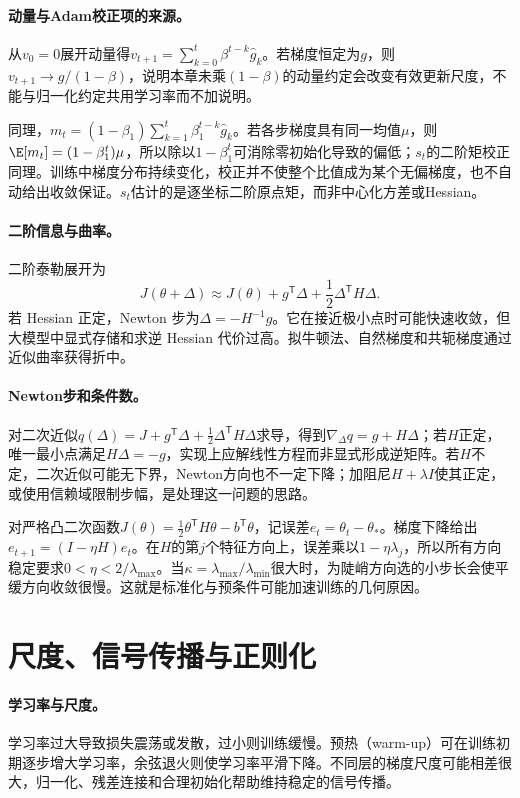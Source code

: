 \paragraph{动量与Adam校正项的来源。}
从$v_0=0$展开动量得$v_{t+1}=\sum_{k=0}^t\beta^{t-k}\hat g_k$。若梯度恒定为$g$，则$v_{t+1}\to g/(1-\beta)$，说明本章未乘$(1-\beta)$的动量约定会改变有效更新尺度，不能与归一化约定共用学习率而不加说明。

同理，$m_t=(1-\beta_1)\sum_{k=1}^t\beta_1^{t-k}\hat g_k$。若各步梯度具有同一均值$\mu$，则$\E[m_t]=(1-\beta_1^t)\mu$，所以除以$1-\beta_1^t$可消除零初始化导致的偏低；$s_t$的二阶矩校正同理。训练中梯度分布持续变化，校正并不使整个比值成为某个无偏梯度，也不自动给出收敛保证。$s_t$估计的是逐坐标二阶原点矩，而非中心化方差或Hessian。

\paragraph{二阶信息与曲率。}
二阶泰勒展开为
\begin{equation}
 J(\theta+\Delta)\approx J(\theta)+g^{\mathsf T}\Delta+\frac12\Delta^{\mathsf T}H\Delta.
\end{equation}
若 Hessian 正定，Newton 步为$\Delta=-H^{-1}g$。它在接近极小点时可能快速收敛，但大模型中显式存储和求逆 Hessian 代价过高。拟牛顿法、自然梯度和共轭梯度通过近似曲率获得折中。

\paragraph{Newton步和条件数。}
对二次近似$q(\Delta)=J+g^{\mathsf T}\Delta+\tfrac12\Delta^{\mathsf T}H\Delta$求导，得到$\nabla_\Delta q=g+H\Delta$；若$H$正定，唯一最小点满足$H\Delta=-g$，实现上应解线性方程而非显式形成逆矩阵。若$H$不定，二次近似可能无下界，Newton方向也不一定下降；加阻尼$H+\lambda I$使其正定，或使用信赖域限制步幅，是处理这一问题的思路。

对严格凸二次函数$J(\theta)=\tfrac12\theta^{\mathsf T}H\theta-b^{\mathsf T}\theta$，记误差$e_t=\theta_t-\theta_*$。梯度下降给出$e_{t+1}=(I-\eta H)e_t$。在$H$的第$j$个特征方向上，误差乘以$1-\eta\lambda_j$，所以所有方向稳定要求$0<\eta<2/\lambda_{\max}$。当$\kappa=\lambda_{\max}/\lambda_{\min}$很大时，为陡峭方向选的小步长会使平缓方向收敛很慢。这就是标准化与预条件可能加速训练的几何原因。

\section{尺度、信号传播与正则化}
\paragraph{学习率与尺度。}
学习率过大导致损失震荡或发散，过小则训练缓慢。预热（warm-up）可在训练初期逐步增大学习率，余弦退火则使学习率平滑下降。不同层的梯度尺度可能相差很大，归一化、残差连接和合理初始化帮助维持稳定的信号传播。

